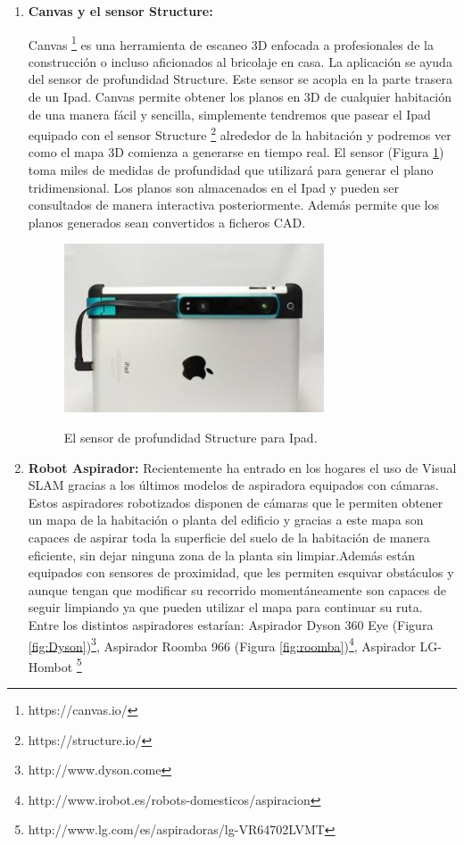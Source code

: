 \begin {enumerate}


\item \textbf{Canvas y el sensor Structure:}

Canvas \footnote{https://canvas.io/ } es una herramienta de escaneo 3D enfocada a profesionales de la construcción o incluso aficionados al bricolaje en casa. La aplicación se ayuda del sensor de profundidad Structure. Este sensor se acopla en la parte trasera de un Ipad. Canvas permite obtener los planos en 3D de cualquier habitación de una manera fácil y sencilla, simplemente tendremos que pasear el Ipad equipado con el sensor Structure \footnote{https://structure.io/} alrededor de la habitación y podremos ver como el mapa 3D comienza a generarse en tiempo real. El sensor (Figura \ref{fig:Structure}) toma miles de medidas de profundidad que utilizará para generar el plano tridimensional. Los planos son almacenados en el Ipad y pueden ser consultados de manera interactiva posteriormente. Además permite que los planos generados sean convertidos a ficheros CAD.

\begin{figure}[htbp]
\begin{center}
\label{fig:Structure}\includegraphics[height=5.0cm]{img/cap2/structureSensorCanvas.jpg}
\end{center}
\caption{El sensor de profundidad Structure para Ipad. }
\end{figure}




\item \textbf{Robot Aspirador:}
Recientemente ha entrado en los hogares el uso de Visual SLAM gracias a los últimos modelos de aspiradora equipados con cámaras.
Estos aspiradores robotizados disponen de cámaras que le permiten obtener un mapa de la habitación o planta del edificio y gracias a este mapa son capaces de aspirar toda la superficie del suelo de la habitación de manera eficiente, sin dejar ninguna zona de la planta sin limpiar.Además están equipados con sensores de proximidad, que les permiten esquivar obstáculos y aunque tengan que modificar su recorrido momentáneamente son capaces de seguir limpiando ya que pueden utilizar el mapa para continuar su ruta. Entre los distintos aspiradores estarían:
Aspirador Dyson 360 Eye (Figura \ref{fig:Dyson})\footnote{http://www.dyson.come}, Aspirador Roomba 966 (Figura \ref{fig:roomba})\footnote{http://www.irobot.es/robots-domesticos/aspiracion}, Aspirador LG-Hombot \footnote{http://www.lg.com/es/aspiradoras/lg-VR64702LVMT}


\end{enumerate}
